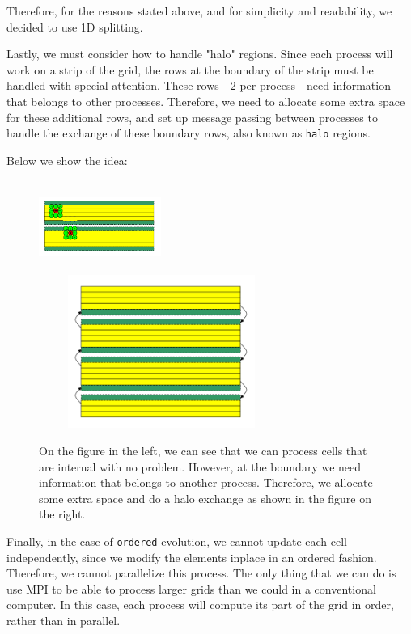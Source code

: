 \documentclass{report}
\begin{document}
Therefore, for the reasons stated above, and for simplicity and readability, we 
decided to use 1D splitting.

Lastly, we must consider how to handle "halo" regions. Since each process will 
work on a strip of the grid, the rows at the boundary of the strip must be handled
with special attention. These rows - 2 per 
process - need information that belongs to other processes.
Therefore, we need to allocate some extra space for these additional rows, and 
set up message passing between processes to handle the exchange of these 
boundary rows, also known as \texttt{halo} regions.

Below we show the idea:

\begin{figure}[H]
\centering
\includegraphics[width=4cm, height=3cm]{./other_images/stencil.png}
\includegraphics[width=8cm, height=5cm]{./other_images/halo_exchange.png}
\caption{\label{fig:haloexchange} On the figure in the left, we can see that 
we can process cells that are internal with no problem. However, at the boundary 
we need information that belongs to another process. Therefore, we allocate 
some extra space and do a halo exchange as shown in the figure on the right.}
\end{figure}

Finally, in the case of \texttt{ordered} evolution, we cannot update each cell 
independently, since we modify the elements inplace in an ordered fashion. 
Therefore, we cannot parallelize this process. The only thing that we can do is 
use MPI to be able to process larger grids than we could in a conventional 
computer. In this case, each process will compute its part of the grid 
in order, rather than in parallel. 
\end{document}
